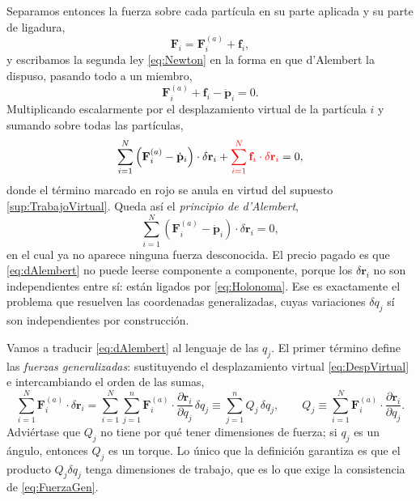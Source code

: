         Separamos entonces la fuerza sobre cada partícula en su parte aplicada y su parte de ligadura,
        \begin{equation}\label{eq:FuerzaSeparada}
            \mathbf{F}_{i} = \mathbf{F}_{i}^{(a)} + \mathbf{f}_{i},
        \end{equation}
        y escribamos la segunda ley \eqref{eq:Newton} en la forma en que d'Alembert la dispuso, pasando todo a un miembro,
        \begin{equation}\label{eq:dAlembertPartida}
            \mathbf{F}_{i}^{(a)} + \mathbf{f}_{i} - \dot{\mathbf{p}}_{i} = 0 .
        \end{equation}
        Multiplicando escalarmente por el desplazamiento virtual de la partícula $i$ y sumando sobre todas las partículas,
        \begin{equation}\label{eq:SumaVirtual}
            \sum_{i=1}^{N}\left(\mathbf{F}_{i}^{(a)} - \dot{\mathbf{p}}_{i}\right)\cdot\delta\mathbf{r}_{i}
            + \textcolor{red}{\sum_{i=1}^{N}\mathbf{f}_{i}\cdot\delta\mathbf{r}_{i}} = 0,
        \end{equation}
        donde el término marcado en rojo se anula en virtud del supuesto \ref{sup:TrabajoVirtual}. Queda así el \textit{principio de d'Alembert},
        \begin{equation}\label{eq:dAlembert}
            \sum_{i=1}^{N}\left(\mathbf{F}_{i}^{(a)} - \dot{\mathbf{p}}_{i}\right)\cdot\delta\mathbf{r}_{i} = 0,
        \end{equation}
        en el cual ya no aparece ninguna fuerza desconocida. El precio pagado es que \eqref{eq:dAlembert} no puede leerse componente a componente, porque los $\delta\mathbf{r}_{i}$ no son independientes entre sí: están ligados por \eqref{eq:Holonoma}. Ese es exactamente el problema que resuelven las coordenadas generalizadas, cuyas variaciones $\delta q_{j}$ sí son independientes por construcción.

        Vamos a traducir \eqref{eq:dAlembert} al lenguaje de las $q_{j}$. El primer término define las \textit{fuerzas generalizadas}: sustituyendo el desplazamiento virtual \eqref{eq:DespVirtual} e intercambiando el orden de las sumas,
        \begin{equation}\label{eq:FuerzaGen}
            \sum_{i=1}^{N}\mathbf{F}_{i}^{(a)}\cdot\delta\mathbf{r}_{i}
            = \sum_{i=1}^{N}\sum_{j=1}^{n}\mathbf{F}_{i}^{(a)}\cdot\frac{\partial\mathbf{r}_{i}}{\partial q_{j}}\,\delta q_{j}
            \equiv \sum_{j=1}^{n} Q_{j}\,\delta q_{j},
            \qquad
            Q_{j} \equiv \sum_{i=1}^{N}\mathbf{F}_{i}^{(a)}\cdot\frac{\partial\mathbf{r}_{i}}{\partial q_{j}} .
        \end{equation}
        Adviértase que $Q_{j}$ no tiene por qué tener dimensiones de fuerza; si $q_{j}$ es un ángulo, entonces $Q_{j}$ es un torque. Lo único que la definición garantiza es que el producto $Q_{j}\delta q_{j}$ tenga dimensiones de trabajo, que es lo que exige la consistencia de \eqref{eq:FuerzaGen}.

